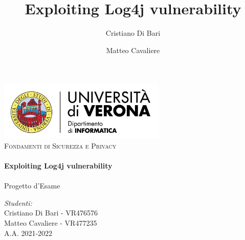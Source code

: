 \documentclass[a4paper, 12pt]{article}
\title{Exploiting Log4j vulnerability}
\author{Cristiano Di Bari}
\author{Matteo Cavaliere}
\begin{document}
\begin{titlepage}
    \vbox{ }

    \begin{center}
        \includegraphics[width=0.60\textwidth]{img/univr-di-logo.png}\\[2cm]
        \textsc{\Large Fondamenti di Sicurezza e Privacy}\\[0.6cm]

        \noindent\makebox[\linewidth]{\rule{.7\paperwidth}{.6pt}}\\[0.7cm]
        { \huge \bfseries Exploiting Log4j vulnerability}\\[0.25cm]
        \noindent\makebox[\linewidth]{\rule{.7\paperwidth}{.6pt}}\\[0.7cm]
        \large{Progetto d'Esame}\\[1.2cm]
        \vfill
        \large
        
        \emph{Studenti:}\\[1mm]
        Cristiano Di Bari  - VR476576\\[1mm]
        Matteo Cavaliere - VR477235\\[2cm]

        {\large A.A. 2021-2022}
    \end{center}
\end{titlepage}

\tableofcontents
\newpage
\end{document}
